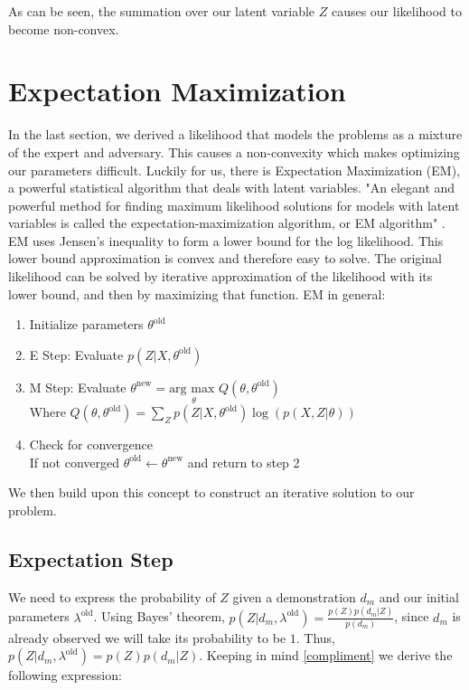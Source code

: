 \documentclass[11pt]{article}
\newcommand{\new}{\text{new}}
\newcommand{\old}{\text{old}}
\newcommand{\argmax}[1]{\underset{#1}{\text{arg max }}}
\begin{document}
As can be seen, the summation over our latent variable $Z$ causes our likelihood to become non-convex.

\section{Expectation Maximization}

\quad In the last section, we derived a likelihood that models the problems as a mixture of the expert and adversary. This causes a non-convexity which makes optimizing our parameters difficult. Luckily for us, there is Expectation Maximization (EM), a powerful statistical algorithm that deals with latent variables. "An elegant and powerful method for finding maximum likelihood solutions for models with latent variables is called the expectation-maximization algorithm, or EM
algorithm" \cite{10.5555/1162264}. EM uses Jensen's inequality to form a lower bound for the log likelihood. This lower bound approximation is convex and therefore easy to solve. The original likelihood can be solved by iterative approximation of the likelihood with its lower bound, and then by maximizing that function. EM in general:

\begin{enumerate}
    \item Initialize parameters $\theta^{\old}$
    \item E Step: Evaluate $p(Z|X, \theta^{\old})$
    \item M Step: Evaluate $\theta^{\new} =  \argmax{\theta} Q(\theta, \theta^{\old})$ \\
    Where $Q(\theta, \theta^{\old}) = \sum_{Z} p(Z|X, \theta^{\old})\log(p(X,Z|\theta))$
    \item Check for convergence\\
    If not converged $\theta^{\old} \leftarrow \theta^{\new}$ and return to step 2\\
    \cite{10.1145/3054912}
\end{enumerate}

We then build upon this concept to construct an iterative solution to our problem.

\subsection{Expectation Step}

\quad We need to express the probability of $Z$ given a demonstration $d_{m}$ and our initial parameters $\lambda^{\old}$. Using Bayes' theorem, $p(Z|d_{m}, \lambda^{\old}) = \frac{p(Z)p(d_{m}|Z)}{p(d_{m})}$, since $d_{m}$ is already observed we will take its probability to be $1$. Thus, $p(Z|d_{m}, \lambda^{\old}) = p(Z)p(d_{m}|Z)$. Keeping in mind \eqref{compliment} we derive the following expression:
\end{document}
